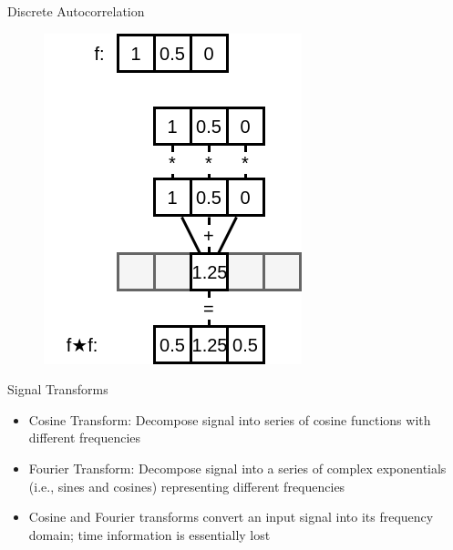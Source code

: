 \documentclass[aspectratio=169]{beamer}
\begin{document}
\begin{frame}{Discrete Autocorrelation}
    \begin{figure}
        \centering
        \includegraphics[height=0.7\textheight]{autocorrelation.png}

    \end{figure}
\end{frame}

\begin{frame}{Signal Transforms}
\begin{itemize}
    \item Cosine Transform: Decompose signal into series of cosine functions with different frequencies
    \item Fourier Transform: Decompose signal into a series of complex exponentials (i.e., sines and cosines) representing different frequencies
    \item Cosine and Fourier transforms convert an input signal into its frequency domain; time information is essentially lost
\end{itemize}
\end{frame}
\end{document}
